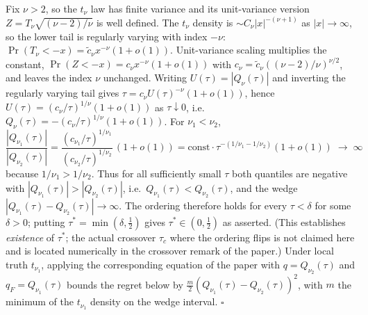 \documentclass[11pt]{article}
\begin{document}
Fix $\nu>2$, so the $t_\nu$ law has finite variance and its
unit-variance version $Z=T_\nu\sqrt{(\nu-2)/\nu}$ is well defined. The
$t_\nu$ density is $\sim C_\nu|x|^{-(\nu+1)}$ as $|x|\to\infty$, so the
lower tail is regularly varying with index $-\nu$: $\Pr(T_\nu<-x)=
\tilde c_\nu x^{-\nu}(1+o(1))$. Unit-variance scaling multiplies the
constant, $\Pr(Z<-x)=c_\nu x^{-\nu}(1+o(1))$ with
$c_\nu=\tilde c_\nu((\nu-2)/\nu)^{\nu/2}$, and leaves the index $\nu$
unchanged. Writing $U(\tau)=|Q_\nu(\tau)|$ and inverting the regularly
varying tail \citep{embrechts1997} gives $\tau=c_\nu U(\tau)^{-\nu}
(1+o(1))$, hence $U(\tau)=(c_\nu/\tau)^{1/\nu}(1+o(1))$ as
$\tau\downarrow0$, i.e.\ $Q_\nu(\tau)=-(c_\nu/\tau)^{1/\nu}(1+o(1))$.
For $\nu_1<\nu_2$,
\[
\frac{|Q_{\nu_1}(\tau)|}{|Q_{\nu_2}(\tau)|}
=\frac{(c_{\nu_1}/\tau)^{1/\nu_1}}{(c_{\nu_2}/\tau)^{1/\nu_2}}\,(1+o(1))
=\text{const}\cdot\tau^{-(1/\nu_1-1/\nu_2)}(1+o(1))\;\longrightarrow\;\infty
\]
because $1/\nu_1>1/\nu_2$. Thus for all sufficiently small $\tau$ both
quantiles are negative with $|Q_{\nu_1}(\tau)|>|Q_{\nu_2}(\tau)|$, i.e.\
$Q_{\nu_1}(\tau)<Q_{\nu_2}(\tau)$, and the wedge
$|Q_{\nu_1}(\tau)-Q_{\nu_2}(\tau)|\to\infty$. The ordering therefore
holds for every $\tau<\delta$ for some $\delta>0$; putting
$\tau^*=\min(\delta,\tfrac12)$ gives $\tau^*\in(0,\tfrac12)$ as
asserted. (This establishes \emph{existence} of $\tau^*$; the actual
crossover $\tau_c$ where the ordering flips is not claimed here and is
located numerically in the crossover remark of the paper.) Under local truth
$t_{\nu_1}$, applying the corresponding equation of the paper with $q=Q_{\nu_2}(\tau)$ and
$q_F=Q_{\nu_1}(\tau)$ bounds the regret below by
$\tfrac{m}{2}(Q_{\nu_1}(\tau)-Q_{\nu_2}(\tau))^2$, with $m$ the minimum
of the $t_{\nu_1}$ density on the wedge interval. \hfill$\square$
\end{document}
